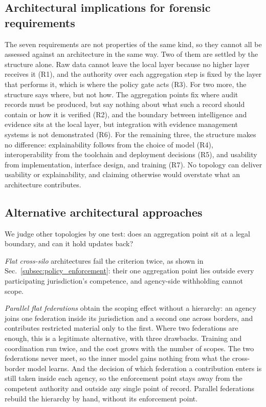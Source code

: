 \subsection{Architectural implications for forensic requirements}
\label{subsec:arch_implications}

The seven requirements are not properties of the same kind, so they cannot all be assessed against an architecture in the same way. Two of them are settled by the structure alone. Raw data cannot leave the local layer because no higher layer receives it (R1), and the authority over each aggregation step is fixed by the layer that performs it, which is where the policy gate acts (R3). For two more, the structure says where, but not how. The aggregation points fix where audit records must be produced, but say nothing about what such a record should contain or how it is verified (R2), and the boundary between intelligence and evidence sits at the local layer, but integration with evidence management systems is not demonstrated (R6). For the remaining three, the structure makes no difference: explainability follows from the choice of model (R4), interoperability from the toolchain and deployment decisions (R5), and usability from implementation, interface design, and training (R7).
%
No topology can deliver usability or explainability, and claiming otherwise would overstate what an architecture contributes.


\subsection{Alternative architectural approaches}
\label{Alternative Architectural Approaches}

We judge other topologies by one test: does an aggregation point sit at a legal boundary, and can it hold updates back?

\emph{Flat cross-silo} architectures fail the criterion twice, as shown in Sec.~\ref{subsec:policy_enforcement}: their one aggregation point lies outside every participating jurisdiction's competence, and agency-side withholding cannot scope.

\emph{Parallel flat federations} obtain the scoping effect without a hierarchy: an agency joins one federation inside its jurisdiction and a second one across borders, and contributes restricted material only to the first. Where two federations are enough, this is a legitimate alternative, with three drawbacks. Training and coordination run twice, and the cost grows with the number of scopes. The two federations never meet, so the inner model gains nothing from what the cross-border model learns. And the decision of which federation a contribution enters is still taken inside each agency, so the enforcement point stays away from the competent authority and outside any single point of record. Parallel federations rebuild the hierarchy by hand, without its enforcement point.

